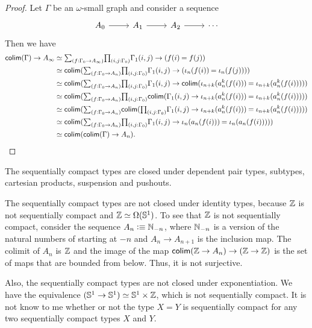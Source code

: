 \begin{proof}
Let $\Gamma$ be an $\omega$-small graph and consider a sequence
\begin{equation*}
\begin{tikzcd}
A_0 \arrow[r] & A_1 \arrow[r] & A_2 \arrow[r] & \cdots
\end{tikzcd}
\end{equation*}
Then we have
\begin{align*}
\tfcolim(\Gamma)\to A_\infty
& \eqvsym \sm{f:\pts{\Gamma}\to A_\infty}\prd{i,j:\pts{\Gamma}}\edg{\Gamma}(i,j)\to(\id{f(i)}{f(j)}) \\
& \eqvsym \tfcolim(\sm{f:\pts{\Gamma}\to A_n}\prd{i,j:\pts{\Gamma}}\edg{\Gamma}(i,j)\to(\id{\iota_n(f(i))}{\iota_n(f(j))})) \\
& \eqvsym \tfcolim(\sm{f:\pts{\Gamma}\to A_n}\prd{i,j:\pts{\Gamma}}\edg{\Gamma}(i,j)\to\tfcolim(\id{\iota_{n+k}(a^k_n(f(i)))}{\iota_{n+k}(a^k_n(f(i)))}))\\
& \eqvsym \tfcolim(\sm{f:\pts{\Gamma}\to A_n}\prd{i,j:\pts{\Gamma}} \tfcolim(\edg{\Gamma}(i,j)\to\id{\iota_{n+k}(a^k_n(f(i)))}{\iota_{n+k}(a^k_n(f(i)))}))\\
& \eqvsym \tfcolim(\sm{f:\pts{\Gamma}\to A_n}\tfcolim(\prd{i,j:\pts{\Gamma}} \edg{\Gamma}(i,j)\to\id{\iota_{n+k}(a^k_n(f(i)))}{\iota_{n+k}(a^k_n(f(i)))}))\\
& \eqvsym \tfcolim(\sm{f:\pts{\Gamma}\to A_n}\prd{i,j:\pts{\Gamma}} \edg{\Gamma}(i,j)\to\id{\iota_{n}(a_n(f(i)))}{\iota_{n}(a_n(f(i)))})) \\
& \eqvsym \tfcolim(\tfcolim(\Gamma)\to A_n).\qedhere
\end{align*}
\end{proof}

\begin{cor}
The sequentially compact types are closed under dependent pair types, subtypes,
cartesian products, suspension and pushouts.
\end{cor}

\begin{rmk}
The sequentially compact types are not closed under identity types, because $\mathbb{Z}$ is not sequentially compact
and $\eqv{\Z}{\Omega(\Sn^1)}$. To see that $\mathbb{Z}$ is not sequentially compact, consider
the sequence $A_n\vcentcolon\equiv\mathbb{N}_{-n}$, where $\mathbb{N}_{-n}$ is a version of the natural
numbers of starting at $-n$ and $A_n\to A_{n+1}$ is the inclusion map. The colimit
of $A_n$ is $\mathbb{Z}$ and the image of the map $\mathsf{colim}(\mathbb{Z}\to A_n)\to (\mathbb{Z}\to\mathbb{Z})$ is
the set of maps that are bounded from below. Thus, it is not surjective.

Also, the sequentially compact types are not closed under exponentiation. We have
the equivalence $\eqv{(\Sn^1\to\Sn^1)}{\Sn^1\times\Z}$, which is not
sequentially compact. It is not know to me whether or not the type $X=Y$ is sequentially compact
for any two sequentially compact types $X$ and $Y$.
\end{rmk}

